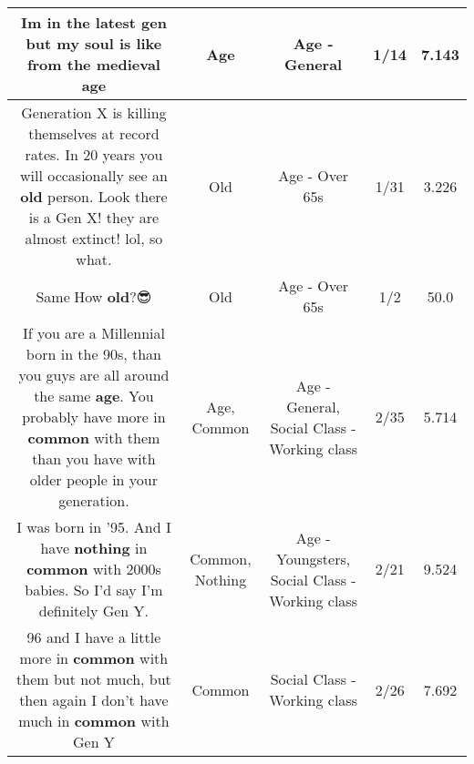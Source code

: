 \documentclass[11pt]{article}
\newlength\mylength
\begin{document}
\begin{center}
\begin{longtable}{|C{.65\mylength}|C{.30\mylength}|C{.12\mylength}|C{.12\mylength}|C{.12\mylength}|}
  \small Im in the latest gen but my soul is like from the medieval age\normalsize   & Age & Age - General & 1/14 & 7.143 \\  \hline
  \small Generation X is killing themselves at record rates.  In 20 years you will occasionally see an \textbf{old} person.  Look there is a Gen X! they are almost extinct!  lol, so what.\normalsize   & Old & Age - Over 65s & 1/31 & 3.226 \\  \hline
  \small Same🤣How \textbf{old}?😎\normalsize   & Old & Age - Over 65s & 1/2 & 50.0 \\  \hline
  \small If you are a Millennial born in the 90s, than you guys are all around the same \textbf{age}. You probably have more in \textbf{common}  with them than you have with older people in your generation.\normalsize   & Age, Common & Age - General, Social Class - Working class & 2/35 & 5.714 \\  \hline
  \small I was born in '95. And I have \textbf{nothing} in \textbf{common} with 2000s babies. So I'd say I'm definitely Gen Y.\normalsize   & Common, Nothing & Age - Youngsters, Social Class - Working class & 2/21 & 9.524 \\  \hline
  \small 96 and I have a little more in \textbf{common} with them but not much, but then again I don't have much in \textbf{common} with Gen Y\normalsize   & Common & Social Class - Working class & 2/26 & 7.692 \\  \hline

\end{longtable}
\end{center}
\end{document}
